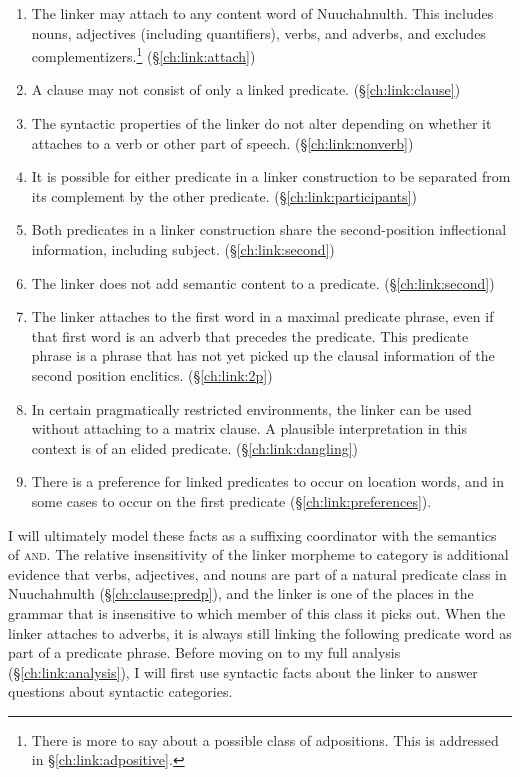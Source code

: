 \begin{enumerate}[nolistsep]
	\item The linker may attach to any content word of Nuuchahnulth. This includes nouns, adjectives (including quantifiers), verbs, and adverbs, and excludes complementizers.\footnote{There is more to say about a possible class of adpositions. This is addressed in \S\ref{ch:link:adpositive}.} (\S\ref{ch:link:attach})
	\item A clause may not consist of only a linked predicate. (\S\ref{ch:link:clause})
	\item The syntactic properties of the linker do not alter depending on whether it attaches to a verb or other part of speech. (\S\ref{ch:link:nonverb})
	\item It is possible for either predicate in a linker construction to be separated from its complement by the other predicate. (\S\ref{ch:link:participants})
	\item Both predicates in a linker construction share the second-position inflectional information, including subject. (\S\ref{ch:link:second})
	\item The linker does not add semantic content to a predicate. (\S\ref{ch:link:second})
	\item The linker attaches to the first word in a maximal predicate phrase, even if that first word is an adverb that precedes the predicate. This predicate phrase is a phrase that has not yet picked up the clausal information of the second position enclitics. (\S\ref{ch:link:2p})
	\item In certain pragmatically restricted environments, the linker can be used without attaching to a matrix clause. A plausible interpretation in this context is of an elided predicate. (\S\ref{ch:link:dangling})
	\item There is a preference for linked predicates to occur on location words, and in some cases to occur on the first predicate (\S\ref{ch:link:preferences}).
\end{enumerate}

I will ultimately model these facts as a suffixing coordinator with the semantics of \textsc{and}. The relative insensitivity of the linker morpheme to category is additional evidence that verbs, adjectives, and nouns are part of a natural predicate class in Nuuchahnulth (\S\ref{ch:clause:predp}), and the linker is one of the places in the grammar that is insensitive to which member of this class it picks out. When the linker attaches to adverbs, it is always still linking the following predicate word as part of a predicate phrase. Before moving on to my full analysis (\S\ref{ch:link:analysis}), I will first use syntactic facts about the linker to answer questions about syntactic categories.

